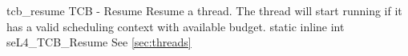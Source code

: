 %
%
%
%

\apidoc
{tcb_resume}
{TCB - Resume}
{Resume a thread. The thread will start running if it has a valid scheduling context with available budget.}
{static inline int seL4\_TCB\_Resume}
{
}
{\errorenumdesc}
{See \autoref{sec:threads}}

